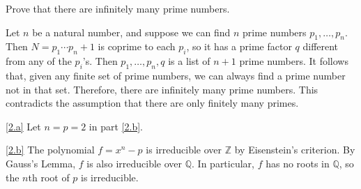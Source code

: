 \documentclass{homework}
\begin{document}
\maketitle

\begin{problem}[Euclid]
Prove that there are infinitely many prime numbers.
\end{problem}

\begin{solution}
Let $n$ be a natural number, and suppose we can find $n$ prime numbers $p_1, \ldots, p_n$.
Then $N = p_1 \cdots p_n + 1$ is coprime to each $p_i$, so it has a prime factor $q$ different from any of the $p_i$'s.
Then $p_1,\ldots,p_n,q$ is a list of $n+1$ prime numbers.
It follows that, given any finite set of prime numbers, we can always find a prime number not in that set.
Therefore, there are infinitely many prime numbers.
This contradicts the assumption that there are only finitely many primes.
\end{solution}

\begin{problem}
\end{problem}

\begin{solution}
\ref{2.a}
Let $n = p = 2$ in part \ref{2.b}.

\ref{2.b}
The polynomial $f = x^n - p$ is irreducible over $\mathbb{Z}$ by Eisenstein's
criterion.
By Gauss's Lemma, $f$ is also irreducible over $\mathbb{Q}$.
In particular, $f$ has no roots in $\mathbb Q$, so the $n$th root of $p$ is
irreducible.
\end{solution}
\end{document}
